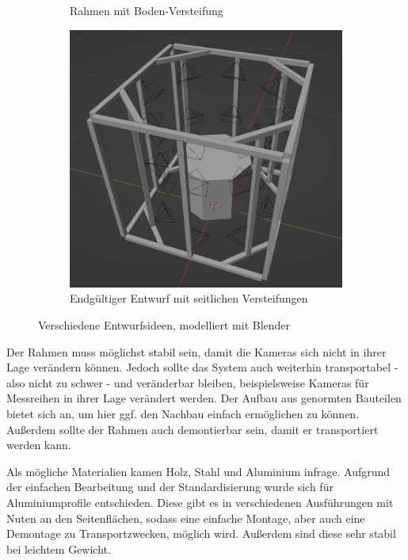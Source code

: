 \documentclass[./00PhotoBox.tex]{subfiles}
\begin{document}
\begin{figure}
\begin{subfigure}{0.30\textwidth}
        \centering
        \caption{Rahmen mit Boden-Versteifung}
        \label{img:entwurf2}
    \end{subfigure}
    \begin{subfigure}{0.30\textwidth}
        \includegraphics[height=1\linewidth]{./img/modell3.png}
        \centering
        \caption{Endgültiger Entwurf mit seitlichen Versteifungen}
        \label{img:entwurf3}
    \end{subfigure}
    \caption{Verschiedene Entwurfsideen, modelliert mit Blender}
    \label{img:entwuerfe}
\end{figure}


Der Rahmen muss möglichst stabil sein, damit die Kameras sich nicht in ihrer Lage verändern können. Jedoch sollte das System auch weiterhin transportabel - also nicht zu schwer - und veränderbar bleiben, beispielsweise Kameras für Messreihen in ihrer Lage verändert werden. Der Aufbau aus genormten Bauteilen bietet sich an, um hier ggf. den Nachbau einfach ermöglichen zu können. Außerdem sollte der Rahmen auch demontierbar sein, damit er transportiert werden kann.

Als mögliche Materialien kamen Holz, Stahl und Aluminium infrage. Aufgrund der einfachen Bearbeitung und der Standardisierung wurde sich für Aluminiumprofile entschieden. Diese gibt es in verschiedenen Ausführungen mit Nuten an den Seitenflächen, sodass eine einfache Montage, aber auch eine Demontage zu Transportzwecken, möglich wird. Außerdem sind diese sehr stabil bei leichtem Gewicht.
\end{document}
